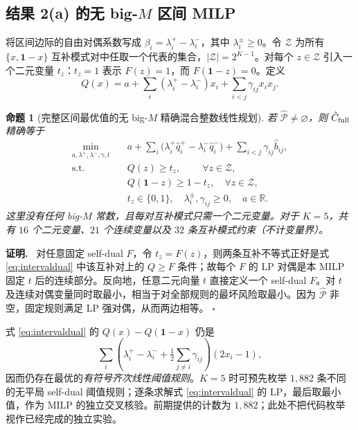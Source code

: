 \documentclass[11pt,a4paper]{ctexart}
\newtheorem{proposition}[theorem]{命题}
\theoremstyle{definition}
\newenvironment{proofcn}{\par\noindent\textbf{证明.}\ }{\hfill$\square$\par}
\newcommand{\calP}{\mathcal P}
\newcommand{\one}{\mathbf 1}
\begin{document}
\subsection{结果 2(a) 的无 big-$M$ 区间 MILP}\label{subsec:milp}
将区间边际的自由对偶系数写成 $\beta_i=\lambda_i^+-\lambda_i^-$，其中 $\lambda_i^\pm\ge0$。令 $\mathcal Z$ 为所有 $\{x,\one-x\}$ 互补模式对中任取一个代表的集合，$|\mathcal Z|=2^{K-1}$。对每个 $z\in\mathcal Z$ 引入一个二元变量 $t_z$：$t_z=1$ 表示 $F(z)=1$，而 $F(\one-z)=0$。定义
\[
Q(x)=a+\sum_i(\lambda_i^+-\lambda_i^-)x_i+\sum_{i<j}\gamma_{ij}x_ix_j.
\]
\begin{proposition}[完整区间最优值的无 big-$M$ 精确混合整数线性规划]\label{prop:milp}
若 $\widehat{\calP}\ne\varnothing$，则 $\hat C_{\rm full}$ 精确等于
\begin{equation}\label{eq:milp}
\begin{aligned}
\min_{a,\lambda^+,\lambda^-,\gamma,t}\quad& a+\sum_i\bigl(\lambda_i^+\hat q_i^+-\lambda_i^-\hat q_i^-\bigr)+\sum_{i<j}\gamma_{ij}\hat b_{ij},\\
\text{s.t.}\quad& Q(z)\ge t_z,\qquad\ \forall z\in\mathcal Z,\\
&Q(\one-z)\ge1-t_z,\quad\forall z\in\mathcal Z,\\
& t_z\in\{0,1\},\quad \lambda_i^\pm,\gamma_{ij}\ge0,\quad a\in\mathbb R.
\end{aligned}
\end{equation}
这里\emph{没有任何 big-$M$ 常数}，且每对互补模式只需一个二元变量。对于 $K=5$，共有 $16$ 个二元变量、$21$ 个连续变量以及 $32$ 条互补模式约束（不计变量界）。
\end{proposition}
\begin{proofcn}
对任意固定 self-dual $F$，令 $t_z=F(z)$，则两条互补不等式正好是式 \eqref{eq:intervaldual} 中该互补对上的 $Q\ge F$ 条件；故每个 $F$ 的 LP 对偶是本 MILP 固定 $t$ 后的连续部分。反向地，任意二元向量 $t$ 直接定义一个 self-dual $F$。对 $t$ 及连续对偶变量同时取最小，相当于对全部规则的最坏风险取最小。因为 $\widehat{\calP}$ 非空，固定规则满足 LP 强对偶，从而两边相等。
\end{proofcn}

式 \eqref{eq:intervaldual} 的 $Q(x)-Q(\one-x)$ 仍是
\[
\sum_i \left(\lambda_i^+-\lambda_i^-+\tfrac12\sum_{j\ne i}\gamma_{ij}\right)(2x_i-1),
\]
因而仍存在最优的\emph{有符号齐次线性阈值规则}。$K=5$ 时可预先枚举 $1{,}882$ 条不同的无平局 self-dual 阈值规则；逐条求解式 \eqref{eq:intervaldual} 的 LP，最后取最小值，作为 MILP 的独立交叉核验。前期提供的计数为 $1{,}882$；此处不把代码枚举视作已经完成的独立实验。
\end{document}
